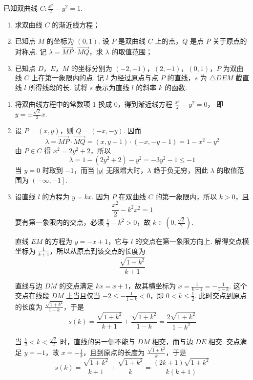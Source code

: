 \begin{problem}
已知双曲线 \(C: \frac{x^2}{2} - y^2 = 1\).

\begin{enumerate}
\item 求双曲线 \(C\) 的渐近线方程；
\item 已知点 \(M\) 的坐标为 \((0,1)\). 设 \(P\) 是双曲线 \(C\) 上的点，\(Q\) 是点 \(P\) 关于原点的对称点. 记 \(\lambda = \overrightarrow{MP} \cdot \overrightarrow{MQ}\)，求 \(\lambda\) 的取值范围；
\item 已知点 \(D\)，\(E\)，\(M\) 的坐标分别为 \((-2, -1)\)，\((2, -1)\)，\((0, 1)\)，\(P\) 为双曲线 \(C\) 上在第一象限内的点. 记 \(l\) 为经过原点与点 \(P\) 的直线，\(s\) 为 \(\triangle DEM\) 截直线 \(l\) 所得线段的长. 试将 \(s\) 表示为直线 \(l\) 的斜率 \(k\) 的函数.
\end{enumerate}
\end{problem}

\begin{solution}
\begin{enumerate}
\item 将双曲线方程中的常数项 \(1\) 换成 \(0\)，得到渐近线方程
\(\frac{x^2}{2}-y^2=0\)，
即 \(y=\pm\frac{\sqrt{2}}{2}x\).

\item 设 \(P=(x,y)\)，则 \(Q=(-x,-y)\). 因而
\[
\lambda=\overrightarrow{MP}\cdot\overrightarrow{MQ}=(x,y-1)\cdot(-x,-y-1)=1-x^2-y^2
\]
由 \(P\in C\) 得 \(x^2=2y^2+2\)，所以
\[
\lambda=1-(2y^2+2)-y^2=-3y^2-1\leqslant-1
\]
当 \(y=0\) 时取到 \(-1\)，而当 \(|y|\) 无限增大时，\(\lambda\) 趋于负无穷，因此 \(\lambda\) 的取值范围为 \(\left(-\infty,-1\right]\).

\item 设直线 \(l\) 的方程为 \(y=kx\). 因为 \(P\) 在双曲线 \(C\) 的第一象限内，所以 \(k>0\)，且
\[
\frac{x^2}{2}-k^2x^2=1
\]
要有第一象限内的交点，必须 \(\frac{1}{2}-k^2>0\)，故 \(k\in\left(0,\frac{\sqrt{2}}{2}\right)\).

直线 \(EM\) 的方程为 \(y=-x+1\)，它与 \(l\) 的交点在第一象限方向上. 解得交点横坐标为 \(\frac{1}{k+1}\)，所以从原点到该交点的长度为
\[
\frac{\sqrt{1+k^2}}{k+1}
\]

直线与边 \(DM\) 的交点满足 \(kx=x+1\)，故其横坐标为 \(x=\frac{1}{k-1}=-\frac{1}{1-k}\). 这个交点在线段 \(DM\) 上当且仅当 \(-2\leqslant-\frac{1}{1-k}<0\)，即 \(0<k\leqslant\frac{1}{2}\). 此时交点到原点的长度为 \(\frac{\sqrt{1+k^2}}{1-k}\)，于是
\[
s(k)=\frac{\sqrt{1+k^2}}{k+1}+\frac{\sqrt{1+k^2}}{1-k}=\frac{2\sqrt{1+k^2}}{1-k^2}
\]

当 \(\frac{1}{2}<k<\frac{\sqrt{2}}{2}\) 时，直线的另一侧不能与 \(DM\) 相交，而与边 \(DE\) 相交. 交点满足 \(y=-1\)，故 \(x=-\frac{1}{k}\)，且到原点的长度为 \(\frac{\sqrt{1+k^2}}{k}\)，于是
\[
s(k)=\frac{\sqrt{1+k^2}}{k+1}+\frac{\sqrt{1+k^2}}{k}=\frac{(2k+1)\sqrt{1+k^2}}{k(k+1)}
\]
\end{enumerate}
\end{solution}

